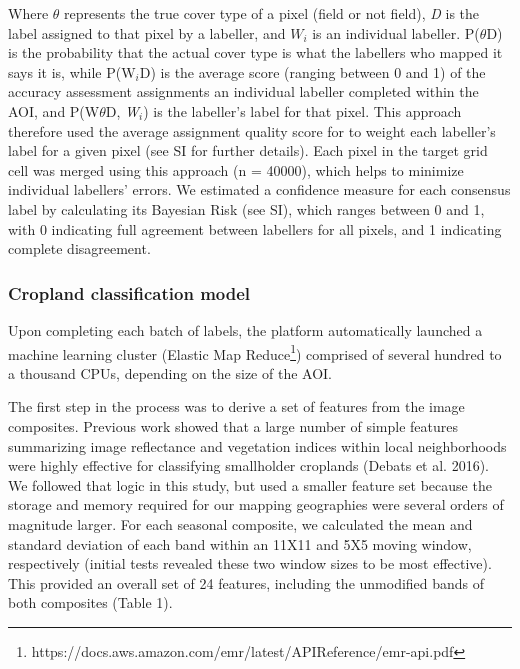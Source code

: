 \documentclass[11pt,a4paper]{article}
\begin{document}
Where \(\theta\) represents the true cover type of a pixel (field or not
field), \emph{D} is the label assigned to that pixel by a labeller, and
\(W_i\) is an individual labeller. P(\(\theta\)\textbar D) is the
probability that the actual cover type is what the labellers who mapped
it says it is, while P(W\(_i\)\textbar D) is the average score (ranging
between 0 and 1) of the accuracy assessment assignments an individual
labeller completed within the AOI, and P(W\(\theta\)\textbar D,
\emph{W}\(_i\)) is the labeller's label for that pixel. This approach
therefore used the average assignment quality score for to weight each
labeller's label for a given pixel (see SI for further details). Each
pixel in the target grid cell was merged using this approach (n =
40000), which helps to minimize individual labellers' errors. We
estimated a confidence measure for each consensus label by calculating
its Bayesian Risk (see SI), which ranges between 0 and 1, with 0
indicating full agreement between labellers for all pixels, and 1
indicating complete disagreement.

\hypertarget{cropland-classification-model}{%
\subsubsection{Cropland classification
model}\label{cropland-classification-model}}

Upon completing each batch of labels, the platform automatically
launched a machine learning cluster (Elastic Map
Reduce\footnote{https://docs.aws.amazon.com/emr/latest/APIReference/emr-api.pdf})
comprised of several hundred to a thousand CPUs, depending on the size
of the AOI.

The first step in the process was to derive a set of features from the
image composites. Previous work showed that a large number of simple
features summarizing image reflectance and vegetation indices within
local neighborhoods were highly effective for classifying smallholder
croplands (Debats et al. 2016). We followed that logic in this study,
but used a smaller feature set because the storage and memory required
for our mapping geographies were several orders of magnitude larger. For
each seasonal composite, we calculated the mean and standard deviation
of each band within an 11X11 and 5X5 moving window, respectively
(initial tests revealed these two window sizes to be most effective).
This provided an overall set of 24 features, including the unmodified
bands of both composites (Table 1).
\end{document}
